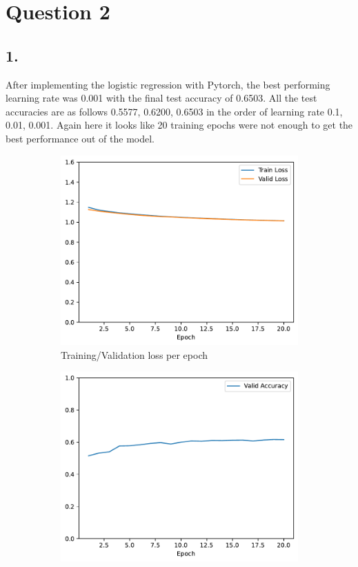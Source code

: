 \documentclass[11pt]{article}
\begin{document}
\clearpage

\section{Question 2}
\subsection{1.}
After implementing the logistic regression with Pytorch, the best performing learning rate was 0.001 with the final test accuracy of 0.6503.
All the test accuracies are as follows 0.5577, 0.6200, 0.6503 in the order of learning rate 0.1, 0.01, 0.001.
Again here it looks like 20 training epochs were not enough to get the best performance out of the model.

\begin{figure}[h!]
\centering
\begin{subfigure}{.5\textwidth}
  \centering
  \includegraphics[width=.9\linewidth]{plots/logistic_regression-training-loss-batch-16-lr-0.001-epochs-20-l2-0-opt-sgd}
  \caption{Training/Validation loss per epoch}
\end{subfigure}%
\begin{subfigure}{.5\textwidth}
  \centering
  \includegraphics[width=.9\linewidth]{plots/logistic_regression-validation-accuracy-batch-16-lr-0.001-epochs-20-l2-0-opt-sgd}

\end{subfigure}
\end{figure}
\end{document}
